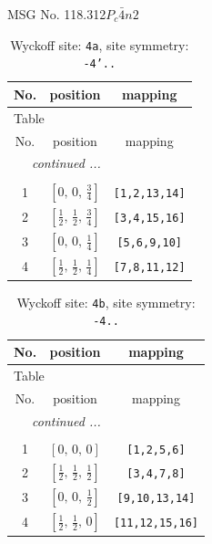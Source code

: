 \documentclass[fleqn,8pt]{jsarticle}
\begin{document}
\setcounter{MaxMatrixCols}{32}

\renewcommand{\tablename}{Table~}
\renewcommand{\figurename}{Figure~}
\begin{center}
\LARGE
MSG No. 118.312\quad$P_{c}\bar{4}n2$
\end{center}
\renewcommand{\arraystretch}{1.2}
\begin{longtable}{ccc}
\caption{Wyckoff site: {\tt 4a}, site symmetry: {\tt -4'..}}
 \\
 \hline \hline
No. & position & mapping \\ \hline \endfirsthead

\multicolumn{2}{l}{\tablename\ \thetable{}} \\
 \hline \hline
No. & position & mapping \\ \hline \endhead

 \hline \hline
\multicolumn{2}{r}{\footnotesize\it continued ...} \\ \endfoot

 \hline \hline
\multicolumn{2}{r}{} \\ \endlastfoot

1 & $\left[ 0,\, 0,\, \frac{3}{4} \right]$ & {\tt [1,2,13,14]} \\ \hline
2 & $\left[ \frac{1}{2},\, \frac{1}{2},\, \frac{3}{4} \right]$ & {\tt [3,4,15,16]} \\ \hline
3 & $\left[ 0,\, 0,\, \frac{1}{4} \right]$ & {\tt [5,6,9,10]} \\ \hline
4 & $\left[ \frac{1}{2},\, \frac{1}{2},\, \frac{1}{4} \right]$ & {\tt [7,8,11,12]} \\
\end{longtable}
\renewcommand{\arraystretch}{1.2}
\begin{longtable}{ccc}
\caption{Wyckoff site: {\tt 4b}, site symmetry: {\tt -4..}}
 \\
 \hline \hline
No. & position & mapping \\ \hline \endfirsthead

\multicolumn{2}{l}{\tablename\ \thetable{}} \\
 \hline \hline
No. & position & mapping \\ \hline \endhead

 \hline \hline
\multicolumn{2}{r}{\footnotesize\it continued ...} \\ \endfoot

 \hline \hline
\multicolumn{2}{r}{} \\ \endlastfoot

1 & $\left[ 0,\, 0,\, 0 \right]$ & {\tt [1,2,5,6]} \\ \hline
2 & $\left[ \frac{1}{2},\, \frac{1}{2},\, \frac{1}{2} \right]$ & {\tt [3,4,7,8]} \\ \hline
3 & $\left[ 0,\, 0,\, \frac{1}{2} \right]$ & {\tt [9,10,13,14]} \\ \hline
4 & $\left[ \frac{1}{2},\, \frac{1}{2},\, 0 \right]$ & {\tt [11,12,15,16]} \\
\end{longtable}
\end{document}
